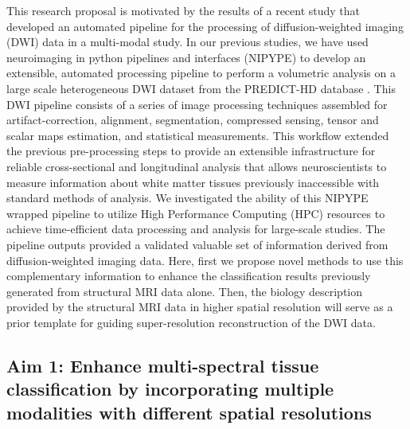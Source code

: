 \noindent 
This research proposal is motivated by the results of a recent study that developed an automated pipeline for the processing of diffusion-weighted imaging (DWI) data in a multi-modal study.
In our previous studies, we have used neuroimaging in python pipelines and interfaces (NIPYPE) \cite{Nipype} to develop an extensible, automated processing pipeline 
to perform a volumetric analysis on a large scale heterogeneous DWI dataset from the PREDICT-HD database \cite{PREDICTHD}. This DWI pipeline consists of a series of image processing techniques assembled for artifact-correction, alignment, segmentation, compressed sensing, tensor and scalar maps estimation, and statistical measurements. This workflow extended the previous pre-processing steps \cite{Matsui2014} to provide an extensible infrastructure for reliable cross-sectional and longitudinal analysis that allows neuroscientists to measure information about white matter tissues previously inaccessible with standard methods of analysis.
We investigated the ability of this NIPYPE wrapped pipeline to utilize High Performance Computing (HPC) resources to achieve time-efficient data processing and analysis for large-scale studies. The pipeline outputs provided a validated valuable set of information derived from diffusion-weighted imaging data. Here, first we propose novel methods to use this complementary information to enhance the classification results previously generated from structural MRI data alone. Then, the biology description provided by the structural MRI data in higher spatial resolution will serve as a prior template for guiding  super-resolution reconstruction of the DWI data.
\newline

\subsection{Aim 1: Enhance multi-spectral tissue classification by incorporating multiple modalities with different spatial resolutions}

